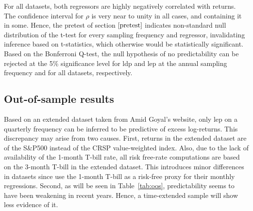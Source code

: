 \documentclass{article}
\begin{document}
For all datasets, both regressors are highly negatively correlated with returns. The confidence interval for $\rho$ is very near to unity in all cases, and containing it in some. Hence, the pretest of section $\ref{pretest}$ indicates non-standard null distribution of the t-test for every sampling frequency and regressor, invalidating inference based on t-statistics, which otherwise would be statistically significant. Based on the Bonferroni Q-test, the null hypothesis of no predictability can be rejected at the 5\% significance level for ldp and lep at the annual sampling frequency and for all datasets, respectively. 
\subsection{Out-of-sample results}
Based on an extended dataset taken from Amid Goyal's website, only lep on a quarterly frequency can be inferred to be predictive of excess log-returns. This discrepancy may arise from two causes. First, returns in the extended dataset are of the S\&P500 instead of the CRSP value-weighted index. Also, due to the lack of availability of the 1-month T-bill rate, all risk free-rate computations are based on the 3-month T-bill in the extended dataset. This introduces minor differences in datasets since \citet{campbell2006efficient} use the 1-month T-bill as a risk-free proxy for their monthly regressions. Second, as will be seen in Table~\vref{tab:oos}, predictability seems to have been weakening in recent years. Hence, a time-extended sample will show less evidence of it.  
\end{document}
